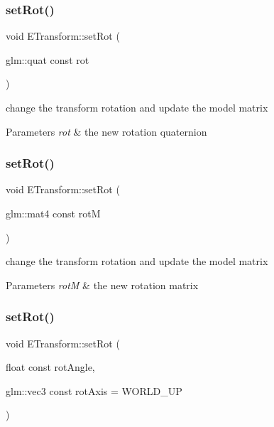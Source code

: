 \subsubsection{\texorpdfstring{set\+Rot()}{setRot()}\hspace{0.1cm}{\footnotesize\ttfamily [1/3]}}
{\footnotesize\ttfamily void E\+Transform\+::set\+Rot (\begin{DoxyParamCaption}\item[{glm\+::quat const}]{rot }\end{DoxyParamCaption})}



change the transform rotation and update the model matrix 


\begin{DoxyParams}{Parameters}
{\em rot} & the new rotation quaternion \\
\hline
\end{DoxyParams}
\mbox{\label{class_e_transform_a5d0af609743540c12883bbee0ef8bc79}} 
\subsubsection{\texorpdfstring{set\+Rot()}{setRot()}\hspace{0.1cm}{\footnotesize\ttfamily [2/3]}}
{\footnotesize\ttfamily void E\+Transform\+::set\+Rot (\begin{DoxyParamCaption}\item[{glm\+::mat4 const}]{rotM }\end{DoxyParamCaption})}



change the transform rotation and update the model matrix 


\begin{DoxyParams}{Parameters}
{\em rotM} & the new rotation matrix \\
\hline
\end{DoxyParams}
\mbox{\label{class_e_transform_a356cecdca7fa9d7f6e06accee8364497}} 
\subsubsection{\texorpdfstring{set\+Rot()}{setRot()}\hspace{0.1cm}{\footnotesize\ttfamily [3/3]}}
{\footnotesize\ttfamily void E\+Transform\+::set\+Rot (\begin{DoxyParamCaption}\item[{float const}]{rot\+Angle,  }\item[{glm\+::vec3 const}]{rot\+Axis = {\ttfamily WORLD\+\_\+UP} }\end{DoxyParamCaption})}



